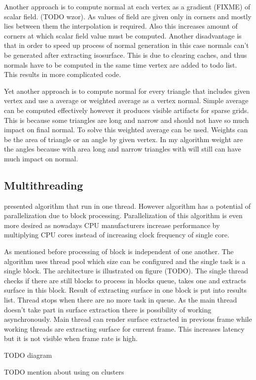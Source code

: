 Another approach is to compute normal at each vertex as a gradient (FIXME) of scalar field. (TODO wzor). As values of field are given only in corners and mostly lies between them the interpolation is required. Also this increases amount of corners at which scalar field value must be computed. Another disadvantage is that in order to speed up process of normal generation in this case normals can't be generated after extracting isosurface. This is due to clearing caches, and thus normals have to be computed in the same time vertex are added to todo list. This results in more complicated code.


Yet another approach is to compute normal for every triangle that includes given vertex and use a average or weighted average as a vertex normal. Simple average can be computed effectively however it produces visible artifacts for sparse grids. This is because some triangles are long and narrow and should not have so much impact on final normal. To solve this weighted average can be used. Weights can be the area of triangle or an angle by given vertex. In my algorithm weight are the angles because with area long and narrow triangles with will still can have much impact on normal. 

\subsection{Multithreading}
\cite{RosenbergBirdwell2008} presented algorithm that run in one thread. However algorithm has a potential of parallelization due to block processing. Parallelization of this algorithm is even more desired as nowadays CPU manufacturers increase performance by multiplying CPU cores instead of increasing clock frequency of single core. 

As mentioned before processing of block is independent of one another. The algorithm uses thread pool which size can be configured and the single task is a single block. The architecture is illustrated on figure (TODO). The single thread checks if there are still blocks to process in blocks queue, takes one and extracts surface in this block. Result of extracting surface in one block is put into results list. Thread stops when there are no more task in queue. As the main thread doesn't take part in surface extraction there is possibility of working asynchronously. Main thread can render surface extracted in previous frame while working threads are extracting surface for current frame. This increases latency but it is not visible when frame rate is high. 

TODO diagram

TODO mention about using on clusters

